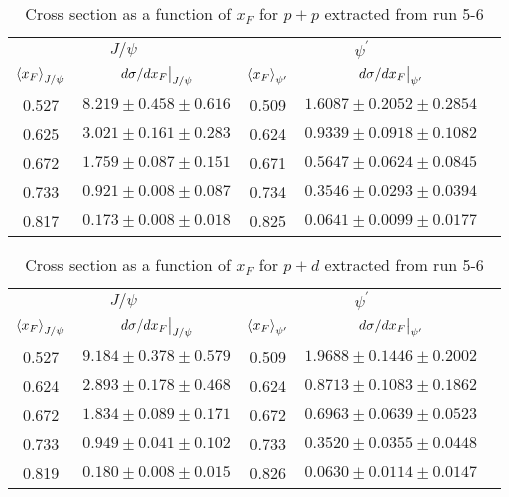 \documentclass[../main.tex]{subfiles}
\begin{document}
\begin{table}[h!]
\centering
\caption{Cross section as a function of $x_F$ for $p+p$ extracted from run 5-6}
\begin{tabular}{cc|ccc}
\multicolumn{2}{c|}{$J/\psi$}                               & \multicolumn{2}{c}{$\psi^{\prime}$}                                &  \\ \cline{1-4}
$\expval{x_F}_{J/\psi}$    & $\eval{d\sigma/dx_F}_{J/\psi}$ & $\expval{x_F}_{\psi^\prime}$ & $\eval{d\sigma/dx_F}_{\psi^\prime}$ &  \\ \cline{1-4}
\multicolumn{1}{c|}{0.527} & $8.219\pm0.458\pm0.616$        & \multicolumn{1}{c|}{0.509}   & $1.6087\pm0.2052\pm0.2854$          &  \\
\multicolumn{1}{c|}{0.625} & $3.021\pm0.161\pm0.283$        & \multicolumn{1}{c|}{0.624}   & $0.9339\pm0.0918\pm0.1082$          &  \\
\multicolumn{1}{c|}{0.672} & $1.759\pm0.087\pm0.151$        & \multicolumn{1}{c|}{0.671}   & $0.5647\pm0.0624\pm0.0845$          &  \\
\multicolumn{1}{c|}{0.733} & $0.921\pm0.008\pm0.087$        & \multicolumn{1}{c|}{0.734}   & $0.3546\pm0.0293\pm0.0394$          &  \\
\multicolumn{1}{c|}{0.817} & $0.173\pm0.008\pm0.018$        & \multicolumn{1}{c|}{0.825}   & $0.0641\pm0.0099\pm0.0177$          &  \\ \cline{1-4}
\end{tabular}
\end{table}
\begin{table}[h!]
\centering
\caption{Cross section as a function of $x_F$ for $p+d$ extracted from run 5-6}
\begin{tabular}{cc|ccc}
\multicolumn{2}{c|}{$J/\psi$}                               & \multicolumn{2}{c}{$\psi^{\prime}$}                                &  \\ \cline{1-4}
$\expval{x_F}_{J/\psi}$    & $\eval{d\sigma/dx_F}_{J/\psi}$ & $\expval{x_F}_{\psi^\prime}$ & $\eval{d\sigma/dx_F}_{\psi^\prime}$ &  \\ \cline{1-4}
\multicolumn{1}{c|}{0.527} & $9.184\pm0.378\pm0.579$        & \multicolumn{1}{c|}{0.509}   & $1.9688\pm0.1446\pm0.2002$          &  \\
\multicolumn{1}{c|}{0.624} & $2.893\pm0.178\pm0.468$        & \multicolumn{1}{c|}{0.624}   & $0.8713\pm0.1083\pm0.1862$          &  \\
\multicolumn{1}{c|}{0.672} & $1.834\pm0.089\pm0.171$        & \multicolumn{1}{c|}{0.672}   & $0.6963\pm0.0639\pm0.0523$          &  \\
\multicolumn{1}{c|}{0.733} & $0.949\pm0.041\pm0.102$        & \multicolumn{1}{c|}{0.733}   & $0.3520\pm0.0355\pm0.0448$          &  \\
\multicolumn{1}{c|}{0.819} & $0.180\pm0.008\pm0.015$        & \multicolumn{1}{c|}{0.826}   & $0.0630\pm0.0114\pm0.0147$          &  \\ \cline{1-4}
\end{tabular}
\end{table}
\end{document}
